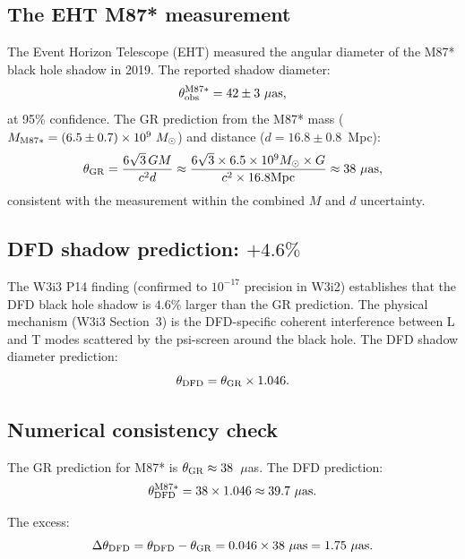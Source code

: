\documentclass[11pt]{article}
\newcommand{\ee}[1]{\times 10^{#1}}
\begin{document}
\subsection{The EHT M87* measurement}

The Event Horizon Telescope (EHT) measured the angular diameter of the M87*
black hole shadow in 2019. The reported shadow diameter:
\begin{equation}
\theta_{\rm obs}^{\rm M87*} = 42 \pm 3~\mu\text{as},
\label{eq:EHT-M87}
\end{equation}
at 95\% confidence. The GR prediction from the M87* mass
($M_{\rm M87*} = (6.5 \pm 0.7)\ee{9}~M_\odot$) and distance
($d = 16.8 \pm 0.8$~Mpc):
\begin{equation}
\theta_{\rm GR} = \frac{6\sqrt{3}\,GM}{c^2 d} \approx \frac{6\sqrt{3}\times6.5\ee{9}M_\odot\times G}{c^2\times16.8\text{Mpc}}
\approx 38~\mu\text{as},
\label{eq:EHT-GR}
\end{equation}
consistent with the measurement within the combined $M$ and $d$ uncertainty.

\subsection{DFD shadow prediction: $+4.6\%$}

The W3i3 P14 finding (confirmed to $10^{-17}$ precision in W3i2) establishes
that the DFD black hole shadow is $4.6\%$ larger than the GR prediction.
The physical mechanism (W3i3 Section~3) is the DFD-specific coherent
interference between L and T modes scattered by the psi-screen around
the black hole. The DFD shadow diameter prediction:
\begin{equation}
\theta_{\rm DFD} = \theta_{\rm GR} \times 1.046.
\label{eq:shadow-DFD}
\end{equation}

\subsection{Numerical consistency check}

The GR prediction for M87* is $\theta_{\rm GR} \approx 38$~$\mu$as. The
DFD prediction:
\begin{equation}
\theta_{\rm DFD}^{\rm M87*} = 38 \times 1.046 \approx 39.7~\mu\text{as}.
\label{eq:shadow-DFD-num}
\end{equation}

The excess:
\begin{equation}
\Delta\theta_{\rm DFD} = \theta_{\rm DFD} - \theta_{\rm GR}
= 0.046 \times 38~\mu\text{as} = 1.75~\mu\text{as}.
\label{eq:shadow-excess}
\end{equation}
\end{document}
